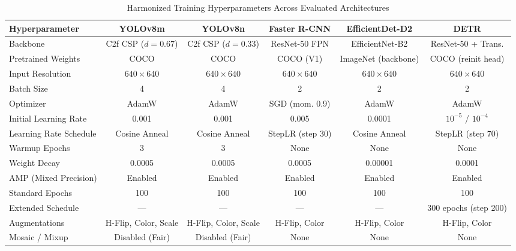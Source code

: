 
\begin{table}[htbp]
\centering
\caption{Harmonized Training Hyperparameters Across Evaluated Architectures}
\label{tab:training_hyperparameters}
\small
\renewcommand{\arraystretch}{1.25}
\setlength{\tabcolsep}{5pt}
\begin{tabular}{lccccc}
\toprule
\textbf{Hyperparameter} & \textbf{YOLOv8m} & \textbf{YOLOv8n} & \textbf{Faster R-CNN} & \textbf{EfficientDet-D2} & \textbf{DETR} \\
\midrule
Backbone & C2f CSP ($d{=}0.67$) & C2f CSP ($d{=}0.33$) & ResNet-50 FPN & EfficientNet-B2 & ResNet-50 + Trans. \\
Pretrained Weights & COCO & COCO & COCO (V1) & ImageNet (backbone) & COCO (reinit head) \\
Input Resolution & $640 \times 640$ & $640 \times 640$ & $640 \times 640$ & $640 \times 640$ & $640 \times 640$ \\
Batch Size & 4 & 4 & 2 & 2 & 2 \\
Optimizer & AdamW & AdamW & SGD (mom. 0.9) & AdamW & AdamW \\
Initial Learning Rate & 0.001 & 0.001 & 0.005 & 0.0001 & $10^{-5}$ / $10^{-4}$ \\
Learning Rate Schedule & Cosine Anneal & Cosine Anneal & StepLR (step 30) & Cosine Anneal & StepLR (step 70) \\
Warmup Epochs & 3 & 3 & None & None & None \\
Weight Decay & 0.0005 & 0.0005 & 0.0005 & 0.00001 & 0.0001 \\
AMP (Mixed Precision) & Enabled & Enabled & Enabled & Enabled & Enabled \\
Standard Epochs & 100 & 100 & 100 & 100 & 100 \\
Extended Schedule & --- & --- & --- & --- & 300 epochs (step 200) \\
Augmentations & H-Flip, Color, Scale & H-Flip, Color, Scale & H-Flip, Color & H-Flip, Color & H-Flip, Color \\
Mosaic / Mixup & Disabled (Fair) & Disabled (Fair) & None & None & None \\
\bottomrule
\end{tabular}
\end{table}
